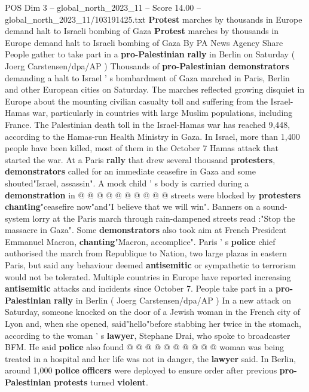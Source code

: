 \begin{textsample}{POS Dim 3 – global\_north\_2023\_11 – Score 14.00 – global\_north\_2023\_11/103191425.txt}  \label{ex:f3_pos_173}
\textbf{Protest} marches by thousands in Europe demand halt to Israeli bombing of Gaza \textbf{Protest} marches by thousands in Europe demand halt to Israeli bombing of Gaza By PA News Agency Share People gather to take part in a \textbf{pro-Palestinian} \textbf{rally} in Berlin on Saturday ( Joerg Carstensen/dpa/AP ) Thousands of \textbf{pro-Palestinian} \textbf{demonstrators} demanding a halt to Israel ' s bombardment of Gaza marched in Paris, Berlin and other European cities on Saturday.
The marches reflected growing disquiet in Europe about the mounting civilian casualty toll and suffering from the Israel-Hamas war, particularly in countries with large Muslim populations, including France.
The Palestinian death toll in the Israel-Hamas war has reached 9,448, according to the Hamas-run Health Ministry in Gaza.
In Israel, more than 1,400 people have been killed, most of them in the October 7 Hamas attack that started the war.
At a Paris \textbf{rally} that drew several thousand \textbf{protesters}, \textbf{demonstrators} called for an immediate ceasefire in Gaza and some shouted"Israel, assassin".
A mock child ' s body is carried during a \textbf{demonstration} in @ @ @ @ @ @ @ @ @ @ streets were blocked by \textbf{protesters} \textbf{chanting}"ceasefire now"and"I believe that we will win".
Banners on a sound-system lorry at the Paris march through rain-dampened streets read :"Stop the massacre in Gaza".
Some \textbf{demonstrators} also took aim at French President Emmanuel Macron, \textbf{chanting}"Macron, accomplice".
Paris ' s \textbf{police} chief authorised the march from Republique to Nation, two large plazas in eastern Paris, but said any behaviour deemed \textbf{antisemitic} or sympathetic to terrorism would not be tolerated.
Multiple countries in Europe have reported increasing \textbf{antisemitic} attacks and incidents since October 7.
People take part in a \textbf{pro-Palestinian} \textbf{rally} in Berlin ( Joerg Carstensen/dpa/AP ) In a new attack on Saturday, someone knocked on the door of a Jewish woman in the French city of Lyon and, when she opened, said"hello"before stabbing her twice in the stomach, according to the woman ' s \textbf{lawyer}, Stephane Drai, who spoke to broadcaster BFM.
He said \textbf{police} also found @ @ @ @ @ @ @ @ @ @ woman was being treated in a hospital and her life was not in danger, the \textbf{lawyer} said.
In Berlin, around 1,000 \textbf{police} \textbf{officers} were deployed to ensure order after previous \textbf{pro-Palestinian} \textbf{protests} turned \textbf{violent}.

\end{textsample}
